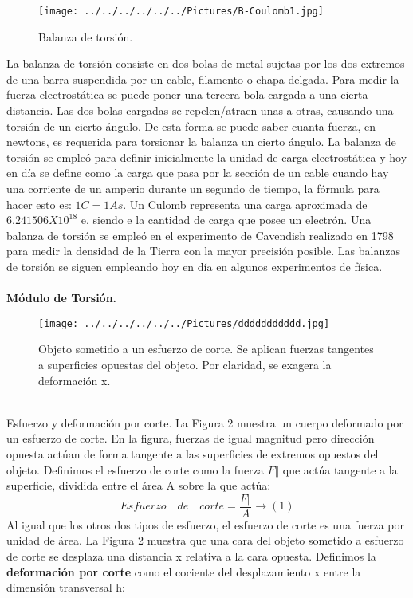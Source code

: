 \documentclass[11pt,a4paper]{article}
\begin{document}
\begin{figure}[hbtp]
\centering
\texttt{[image: ../../../../../../Pictures/B-Coulomb1.jpg]}
\caption{Balanza de torsi\'{o}n.}
\end{figure}
La balanza de torsi\'{o}n consiste en dos bolas de metal sujetas por los dos extremos de una barra suspendida por un cable, filamento o chapa delgada. Para medir la fuerza electrost\'{a}tica se puede poner una tercera bola cargada a una cierta distancia. Las dos bolas cargadas se repelen/atraen unas a otras, causando una torsi\'{o}n de un cierto \'{a}ngulo. De esta forma se puede saber cuanta fuerza, en newtons, es requerida para torsionar la balanza un cierto \'{a}ngulo. La balanza de torsi\'{o}n se emple\'{o} para definir inicialmente la unidad de carga electrost\'{a}tica y hoy en d\'{i}a se define como la carga que pasa por la secci\'{o}n de un cable cuando hay una corriente de un amperio durante un segundo de tiempo, la f\'{o}rmula para hacer esto es: $1 C = 1 As$. Un Culomb representa una carga aproximada de $6.241506X10^{18}$ e, siendo e la cantidad de carga que posee un electr\'{o}n.
Una balanza de torsi\'{o}n se emple\'{o} en el experimento de Cavendish realizado en 1798 para medir la densidad de la Tierra con la mayor precisi\'{o}n posible. Las balanzas de torsi\'{o}n se siguen empleando hoy en d\'{i}a en algunos experimentos de f\'{i}sica.\\
\\
\textbf{M\'{o}dulo de Torsi\'{o}n.}
\begin{figure}[hbtp]
\centering
\texttt{[image: ../../../../../../Pictures/ddddddddddd.jpg]}
\caption{Objeto sometido a un esfuerzo de corte. Se aplican fuerzas tangentes a superficies opuestas del objeto. Por
claridad, se exagera la deformaci\'{o}n x.}
\end{figure}
\\
Esfuerzo y deformaci\'{o}n por corte. La Figura 2 muestra un cuerpo deformado por un esfuerzo de corte. En la figura, fuerzas de igual magnitud pero direcci\'{o}n opuesta act\'{u}an de forma tangente a las superficies de extremos opuestos del objeto. Definimos el esfuerzo de corte como la fuerza $F\Vert$ que act\'{u}a tangente a la superficie, dividida entre el \'{a}rea A sobre la que act\'{u}a:
\[Esfuerzo \quad de \quad corte = \frac{F\Vert}{A}\longrightarrow (1)\]
Al igual que los otros dos tipos de esfuerzo, el esfuerzo de corte es una fuerza por unidad de \'{a}rea. La Figura 2
muestra que una cara del objeto sometido a esfuerzo de corte se desplaza una distancia x relativa a la cara opuesta. Definimos la \textbf{deformaci\'{o}n por corte} como el cociente del desplazamiento x entre la dimensi\'{o}n transversal h:
\end{document}

